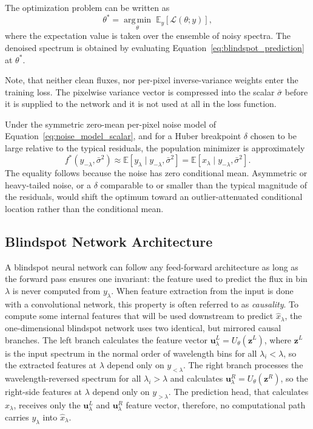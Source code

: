 \documentclass[twocolumn]{aastex7}
\newcommand{\m}[1]{\mathbf{#1}}
\newcounter{algorithm}
\begin{document}
The optimization problem can be written as
\begin{equation}
    \theta^\ast = \operatorname*{arg\,min}_{\theta}\;\mathbb{E}_{y}\!\left[\mathcal{L}(\theta;y)\right],
    \label{eq:theta_star}
\end{equation}
where the expectation value is taken over the ensemble of noisy spectra. The denoised spectrum is obtained by evaluating Equation~\ref{eq:blindspot_prediction} at $\theta^\ast$.

Note, that neither clean fluxes, nor per-pixel inverse-variance weights enter the training loss. The pixelwise variance vector is compressed into the scalar $\bar{\sigma}$ before it is supplied to the network and it is not used at all in the loss function.

Under the symmetric zero-mean per-pixel noise model of Equation~\ref{eq:noise_model_scalar}, and for a Huber breakpoint $\delta$ chosen to be large relative to the typical residuals, the population minimizer is approximately
\begin{equation}
    f^\ast(y_{-\lambda},\bar{\sigma}^2)
    \approx
    \mathbb{E}\!\left[y_{\lambda}\mid y_{-\lambda},\bar{\sigma}^2\right]
    =
    \mathbb{E}\!\left[x_{\lambda}\mid y_{-\lambda},\bar{\sigma}^2\right].
    \label{eq:population_target}
\end{equation}
The equality follows because the noise has zero conditional mean. Asymmetric or heavy-tailed noise, or a $\delta$ comparable to or smaller than the typical magnitude of the residuals, would shift the optimum toward an outlier-attenuated conditional location rather than the conditional mean.

\subsection{Blindspot Network Architecture}
\label{sec:blindspot_algorithm}

A blindspot neural network can follow any feed-forward architecture 
as long as the forward pass ensures one invariant: the feature used to predict the flux in bin $\lambda$ is never computed from $y_{\lambda}$. When feature extraction from the input is done with a convolutional network, this property is often referred to as \textit{causality}. To compute some internal features that will be used downstream to predict $\hat{x}_{\lambda}$, the one-dimensional blindspot network uses two identical, but mirrored causal branches. The left branch calculates the feature vector $\m{u}_{\lambda}^{L} = U_{\theta}(\m{z}^{L})$, where $\m{z}^{L}$ is the input spectrum in the normal order of wavelength bins for all $\lambda_i < \lambda$, so the extracted features at $\lambda$ depend only on $y_{<\lambda}$. The right branch processes the wavelength-reversed spectrum for all $\lambda_i > \lambda$ and calculates $\m{u}_{\lambda}^{R} = U_{\theta}(\m{z}^{R})$, so the right-side features at $\lambda$ depend only on $y_{>\lambda}$. The prediction head, that calculates $\hat{x}_{\lambda}$, receives only the $\m{u}_{\lambda}^{L}$ and $\m{u}_{\lambda}^{R}$ feature vector, therefore, no computational path carries $y_{\lambda}$ into $\hat{x}_{\lambda}$.
\end{document}
